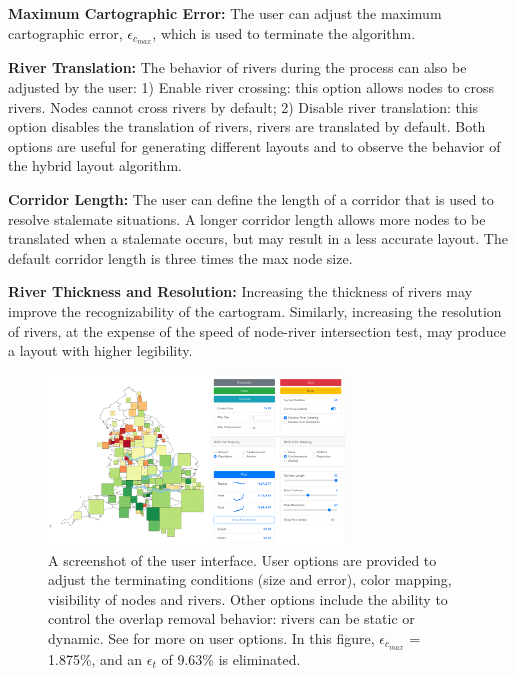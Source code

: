 \documentclass[Afour,sagev,times]{sagej}
\newcommand{\bobgraph}[1]{\noindent\textbf{#1}}
\newcommand{\nodeError}{\epsilon}
\newcommand{\nodeCartographicErrorMax}{\nodeError_{c_{max}}}
\newcommand{\nodeTopologicalError}{\nodeError_{t}}
\begin{document}
\bobgraph{Maximum Cartographic Error:} The user can adjust the maximum cartographic error, $ \nodeCartographicErrorMax $, which is used to terminate the algorithm.

\bobgraph{River Translation:} The behavior of rivers during the process can also be adjusted by the user: 1) Enable river crossing: this option allows nodes to cross rivers. Nodes cannot cross rivers by default; 2) Disable river translation: this option disables the translation of rivers, rivers are translated by default. Both options are useful for generating different layouts and to observe the behavior of the hybrid layout algorithm.

\bobgraph{Corridor Length:} The user can define the length of a corridor that is used to resolve stalemate situations. A longer corridor length allows more nodes to be translated when a stalemate occurs, but may result in a less accurate layout. The default corridor length is three times the max node size.

\bobgraph{River Thickness and Resolution:} Increasing the thickness of rivers may improve the recognizability of the cartogram. Similarly, increasing the resolution of rivers, at the expense of the speed of node-river intersection test, may produce a layout with higher legibility.

    {
        \begin{figure}[tb!]
            \centering
            \includegraphics[width=0.7\textwidth,keepaspectratio]{UI.png}
            \caption{A screenshot of the user interface. User options are provided to adjust the terminating conditions (size and error), color mapping, visibility of nodes and rivers. Other options include the ability to control the overlap removal behavior: rivers can be static or dynamic. See  for more on user options. In this figure, $ \nodeCartographicErrorMax $ = 1.875\%, and an $ \nodeTopologicalError $ of 9.63\% is eliminated.}
            \label{fig:overview}
        \end{figure}
    }
\end{document}
